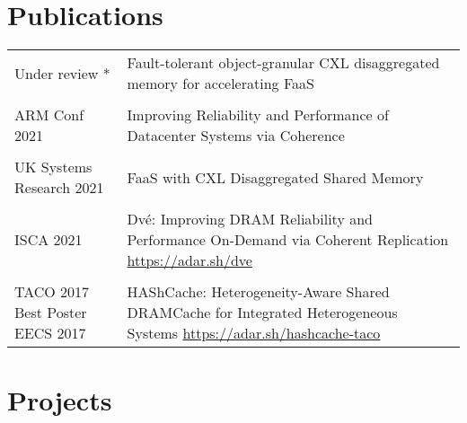 \documentclass[a4paper,10pt]{article} %
\begin{document}
\section{Publications}
\begin{tabular}{p{3cm}p{11cm}}
Under review * &  Fault-tolerant object-granular CXL disaggregated memory for accelerating FaaS \\
& \\
ARM Conf 2021 & Improving Reliability and Performance of Datacenter Systems via \newline Coherence \\	
&\\
UK Systems \newline Research 2021 & FaaS with CXL Disaggregated Shared Memory \\
& \\
ISCA 2021 & Dv\'e: Improving DRAM Reliability and Performance On-Demand via \newline Coherent Replication \hfill  \href{https://adar.sh/dve}{https://adar.sh/dve}\\
&\\
TACO 2017 \newline \footnotesize{Best Poster EECS 2017} & HAShCache: Heterogeneity-Aware Shared DRAMCache for Integrated Heterogeneous Systems  \hfill
\href{https://adar.sh/hashcache-taco}{https://adar.sh/hashcache-taco}
\\
\end{tabular}

\section{Projects}
\end{document}
